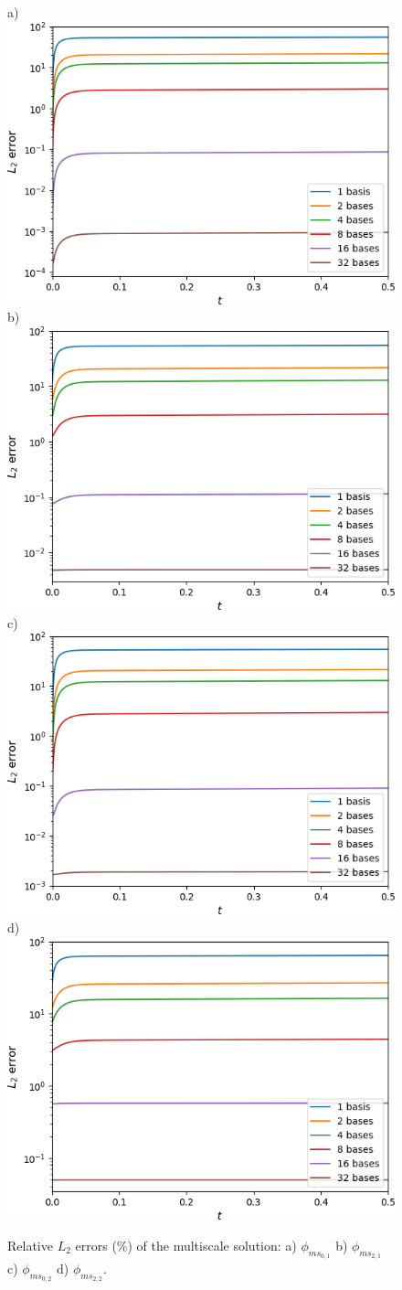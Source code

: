 \documentclass[preprint]{elsarticle}
\begin{document}
\begin{figure}[ht]
	\centering
		a)\includegraphics[width=0.45\linewidth]{twigl/L2_u1.png} 
		b)\includegraphics[width=0.45\linewidth]{twigl/L2_u2.png} 
		c)\includegraphics[width=0.45\linewidth]{twigl/L2_u3.png} 
		d)\includegraphics[width=0.45\linewidth]{twigl/L2_u4.png} 
	\caption{Relative $L_2$ errors ($\%$) of the multiscale solution: a) $\phi_{ms_{0, 1}}$ b) $\phi_{ms_{2, 1}}$ c) $\phi_{ms_{0, 2}}$ d) $\phi_{ms_{2, 2}}$.}
	\label{twigl_L2}
\end{figure}
\end{document}

